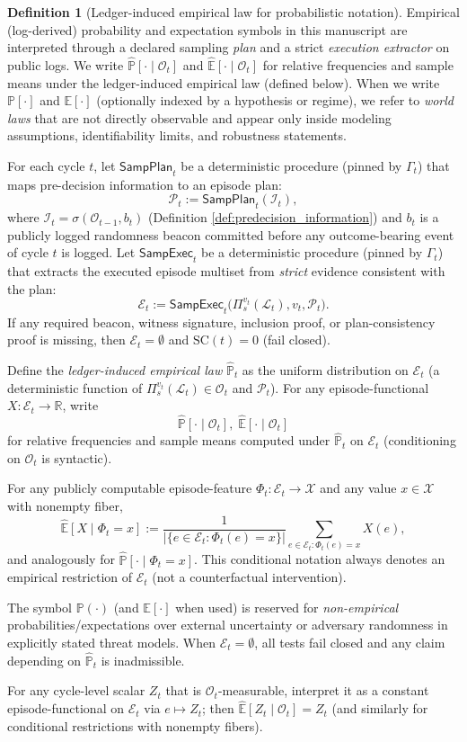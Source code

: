 \documentclass[11pt,a4paper]{article}
\newcommand{\R}{\mathbb{R}}
\newcommand{\E}{\mathbb{E}}
\newcommand{\Prob}{\mathbb{P}}
\newcommand{\LProb}{\widehat{\mathbb{P}}}
\newcommand{\LE}{\widehat{\mathbb{E}}}
\newcommand{\cI}{\mathcal{I}}
\newcommand{\cL}{\mathcal{L}}
\newcommand{\cO}{\mathcal{O}}
\theoremstyle{definition}
\newtheorem{definition}{Definition}
\theoremstyle{remark}
\begin{document}
\begin{definition}[Ledger-induced empirical law for probabilistic notation]\label{def:ledger_induced_empirical_law_for_probabilistic_notation}
Empirical (log-derived) probability and expectation symbols in this manuscript are interpreted through a declared sampling \emph{plan} and a strict \emph{execution extractor} on public logs.
We write $\LProb[\cdot\mid\cO_t]$ and $\LE[\cdot\mid\cO_t]$ for relative frequencies and sample means under the ledger-induced empirical law (defined below).
When we write $\Prob[\cdot]$ and $\E[\cdot]$ (optionally indexed by a hypothesis or regime), we refer to \emph{world laws} that are not directly observable and appear only inside modeling assumptions, identifiability limits, and robustness statements.

For each cycle $t$, let $\mathsf{SampPlan}_t$ be a deterministic procedure (pinned by $\Gamma_t$) that maps pre-decision information to an episode plan:
\[
\mathcal P_t:=\mathsf{SampPlan}_t(\cI_t),
\]
where $\cI_t=\sigma(\cO_{t-1},b_t)$ (Definition \ref{def:predecision_information}) and $b_t$ is a publicly logged randomness beacon committed before any outcome-bearing event of cycle $t$ is logged.
Let $\mathsf{SampExec}_t$ be a deterministic procedure (pinned by $\Gamma_t$) that extracts the executed episode multiset from \emph{strict} evidence consistent with the plan:
\[
\mathcal E_t:=\mathsf{SampExec}_t\big(\Pi_s^{v_t}(\cL_t),v_t,\mathcal P_t\big).
\]
If any required beacon, witness signature, inclusion proof, or plan-consistency proof is missing, then $\mathcal E_t=\emptyset$ and $\mathrm{SC}(t)=0$ (fail closed).

Define the \emph{ledger-induced empirical law} $\LProb_t$ as the uniform distribution on $\mathcal E_t$ (a deterministic function of $\Pi_s^{v_t}(\cL_t)\in\cO_t$ and $\mathcal P_t$).
For any episode-functional $X:\mathcal E_t\to\R$, write
\[
\LProb[\cdot\mid \cO_t],\;\LE[\cdot\mid \cO_t]
\]
for relative frequencies and sample means computed under $\LProb_t$ on $\mathcal E_t$ (conditioning on $\cO_t$ is syntactic).

For any publicly computable episode-feature $\Phi_t:\mathcal E_t\to\mathcal X$ and any value $x\in\mathcal X$ with nonempty fiber,
\[
\LE[X\mid \Phi_t=x]:=\frac{1}{|\{e\in\mathcal E_t:\Phi_t(e)=x\}|}\sum_{e\in\mathcal E_t:\Phi_t(e)=x} X(e),
\]
and analogously for $\LProb[\cdot\mid \Phi_t=x]$.
This conditional notation always denotes an empirical restriction of $\mathcal E_t$ (not a counterfactual intervention).

The symbol $\Prob(\cdot)$ (and $\E[\cdot]$ when used) is reserved for \emph{non-empirical} probabilities/expectations over external uncertainty or adversary randomness in explicitly stated threat models.
When $\mathcal E_t=\emptyset$, all tests fail closed and any claim depending on $\LProb_t$ is inadmissible.

For any cycle-level scalar $Z_t$ that is $\cO_t$-measurable, interpret it as a constant episode-functional on $\mathcal E_t$ via $e\mapsto Z_t$; then $\LE[Z_t\mid \cO_t]=Z_t$ (and similarly for conditional restrictions with nonempty fibers).
\end{definition}
\end{document}
